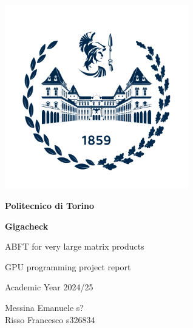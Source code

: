 \begin{titlepage}
	\begin{center}
		\vspace*{1cm}

		\includegraphics[width=0.60\textwidth]{images/logopoli}

		\vspace*{1cm}

		\LARGE
		\textbf{Politecnico di Torino}

		\vspace*{2cm}

		\Huge
		\textbf{Gigacheck}

		\vspace{0.5cm}

		\Large
		ABFT for very large matrix products

		\vspace{2cm}

		\Large
		GPU programming project report

		Academic Year 2024/25

		\vfill

		\large
		Messina Emanuele s? \\
		Risso Francesco s326834\\

	\end{center}
\end{titlepage}
